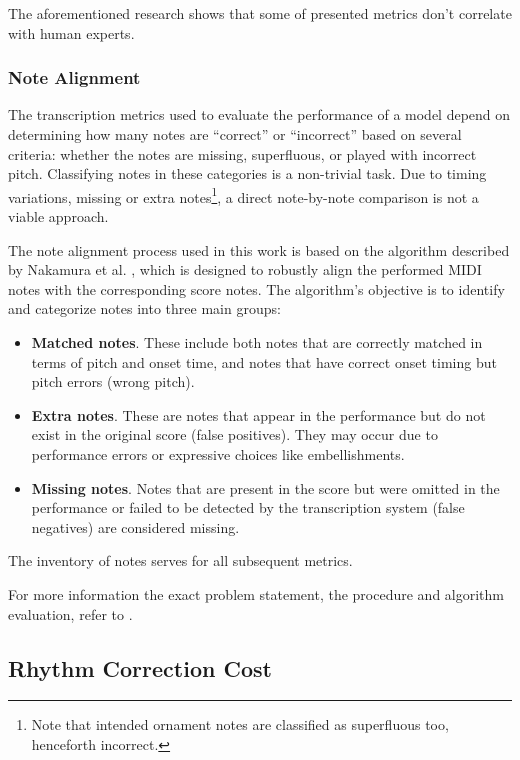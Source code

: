 The aforementioned research \cite{Holzapfel2021} shows that some of presented metrics don't correlate with human experts. 

\subsubsection{Note Alignment}

The transcription metrics used to evaluate the performance of a model depend on determining how many notes are ``correct'' or ``incorrect'' based on several criteria: whether the notes are missing, superfluous, or played with incorrect pitch. Classifying notes in these categories is a non-trivial task. Due to timing variations, missing or extra notes\footnote{Note that intended ornament notes are classified as superfluous too, henceforth incorrect.}, a direct note-by-note comparison is not a viable approach.

The note alignment process used in this work is based on the algorithm described by Nakamura et al. \cite{Nakamura2017b}, which is designed to robustly align the performed MIDI notes with the corresponding score notes. The algorithm’s objective is to identify and categorize notes into three main groups: \begin{itemize}
	\item {\bf Matched notes}. These include both notes that are correctly matched in terms of pitch and onset time, and notes that have correct onset timing but pitch errors (wrong pitch).
	\item {\bf Extra notes}. These are notes that appear in the performance but do not exist in the original score (false positives). They may occur due to performance errors or expressive choices like embellishments.
	\item {\bf Missing notes}. Notes that are present in the score but were omitted in the performance or failed to be detected by the transcription system (false negatives) are considered missing.
\end{itemize}

The inventory of notes serves for all subsequent metrics.

For more information the exact problem statement, the procedure and algorithm evaluation, refer to \cite{Nakamura2017b}.

\subsection{Rhythm Correction Cost}



